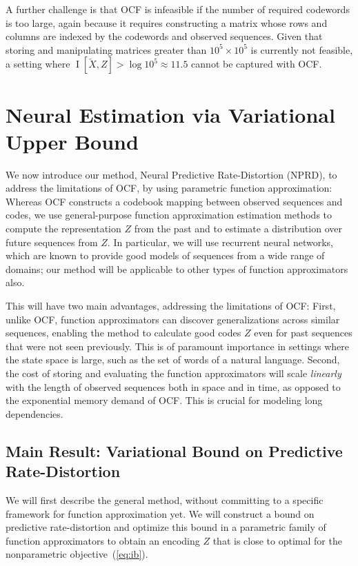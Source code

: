 \documentclass[entropy,article,submit,moreauthors,pdftex,10pt,a4paper]{Definitions/mdpi}
\newcommand{\past}{\overleftarrow{X}}
\begin{document}
A further challenge is that OCF is infeasible if the number of required codewords is too large, again because it requires constructing a matrix whose rows and columns are indexed by the codewords and observed sequences.
Given that storing and manipulating matrices greater than $10^5 \times 10^5$ is currently not feasible, a setting where $\operatorname{I}[\past, Z] > \log 10^5 \approx 11.5$ cannot be captured with OCF.

\section{Neural Estimation via Variational Upper Bound}\label{sec:nprd}

We now introduce our method, Neural Predictive Rate-Distortion (NPRD), to address the limitations of OCF, by using parametric function approximation:
Whereas OCF constructs a codebook mapping between observed sequences and codes, we use general-purpose function approximation estimation methods to compute the representation $Z$ from the past and to estimate a distribution over future sequences from $Z$.
In particular, we will use recurrent neural networks, which are known to provide good models of sequences from a wide range of domains; our method will be applicable to other types of function approximators also.

This will have two main advantages, addressing the limitations of OCF:
First, unlike OCF, function approximators can discover generalizations across similar sequences, enabling the method to calculate good codes $Z$ even for past sequences that were not seen previously.
This is of paramount importance in settings where the state space is large, such as the set of words of a natural language.
Second, the cost of storing and evaluating the function approximators will scale \emph{linearly} with the length of observed sequences both in space and in time, as opposed to the exponential memory demand of OCF.
This is crucial for modeling long dependencies.

\subsection{Main Result: Variational Bound on Predictive Rate-Distortion}
We will first describe the general method, without committing to a specific framework for function approximation yet.
We will construct a bound on predictive rate-distortion and optimize this bound in a parametric family of function approximators to obtain an encoding $Z$ that is close to optimal for the nonparametric objective~(\ref{eq:ib}).
\end{document}
